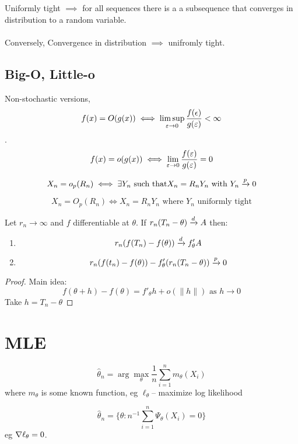 \documentclass{article}
\begin{document}
\begin{theorem}[Prohorov]
Uniformly tight $\implies$ for all sequences there is a a subsequence that converges in distribution to a random variable.\\\\
Conversely, 
Convergence in distribution $\implies$ unifromly tight. 
\end{theorem}


\subsection{Big-O, Little-o}
Non-stochastic versions, 
$$f(x) = O(g(x)) \iff \limsup_{\varepsilon\to 0} \frac{f(\epsilon)}{g(\varepsilon)} < \infty$$.
$$f(x) = o(g(x)) \iff \lim_{\varepsilon \to 0} \frac{f(\varepsilon)}{g(\varepsilon)} = 0 $$

\begin{definition}[Little-${o_p}$]
$$X_n = o_p(R_n) \iff \exists Y_n \text{ such that} X_n = R_n Y_n \text{ with } Y_n \xrightarrow{p} 0$$
\end{definition}
\begin{definition}[Big $O_p$]
$$X_n = O_p(R_n) \iff X_n = R_n Y_n \text{ where } Y_n \text{ uniformly tight}$$
\end{definition}

\begin{theorem}
Let $r_n\to \infty$ and $f$ differentiable at $\theta$. If $r_n (T_n -\theta)\xrightarrow{d} A$ then:
\begin{enumerate}
	\item $$r_n(f(T_n) - f(\theta)) \xrightarrow{d} f'_\theta A$$
	\item $$r_n(f(t_n) - f(\theta)) - f_\theta'(r_n (T_n - \theta)) \xrightarrow{p} 0$$
\end{enumerate}
\begin{proof}
	Main idea:
	$$f(\theta + h) - f(\theta) = f'_\theta h + o(\|h \|) \text{ as } h\to 0$$
	Take $h = T_n - \theta$ 
\end{proof}

\end{theorem}
\begin{theorem}
\end{theorem}

\section{MLE}
\begin{definition}[M-estimators]
$$\hat \theta_n = \arg \max_\theta \frac{1}{n} \sum_{i=1}^n m_\theta(X_i)$$
where $m_\theta$ is some known function, eg $\ell_\theta$-- maximize log likelihood 

\end{definition}
\begin{definition}[Z-estimator]
$$\hat \theta _n = \{\theta: n^{-1} \sum_{i=1}^n \Psi_\theta(X_i) = 0\}$$
eg $\nabla \ell_\theta = 0$. 
\end{definition}
\end{document}
